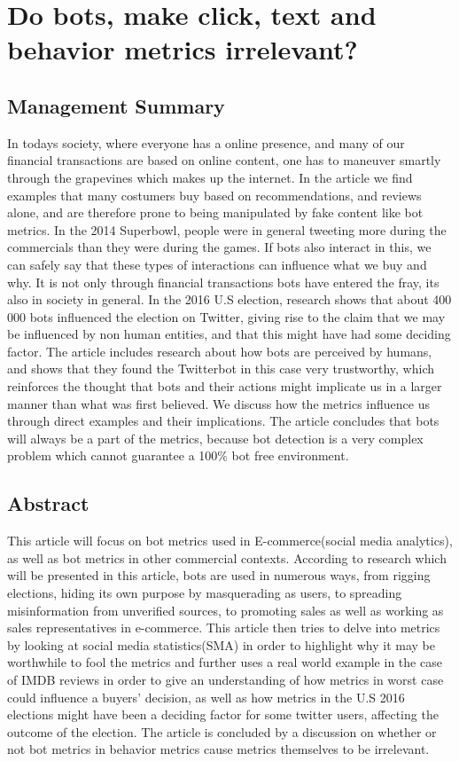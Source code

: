 \chapter[Bot Metrics]{Do bots,  make click, text and behavior metrics irrelevant?}
\section{Management Summary}
In todays society, where everyone has a online presence, and many of our financial transactions are based on online content, one has to maneuver smartly through the grapevines which makes up the internet. In the article we find examples that many costumers buy based on recommendations, and reviews alone, and are therefore prone to being manipulated by fake content like bot metrics. In the 2014 Superbowl, people were in general tweeting more during the commercials than they were during the games. If bots also interact in this, we can safely say that these types of interactions can influence what we buy and why. 
It is not only through financial transactions bots have entered the fray, its also in society in general. In the 2016 U.S election, research shows that about 400 000 bots influenced the election on Twitter, giving rise to the claim that we may be influenced by non human entities, and that this might have had some deciding factor. The article includes research about how bots are perceived by humans, and shows that they found the Twitterbot in this case very trustworthy, which reinforces the thought that bots and their actions might implicate us in a larger manner than what was first believed. We discuss how the metrics influence us through direct examples and their implications. The article concludes that bots will always be a part of the metrics, because bot detection is a very complex problem which cannot guarantee a 100\% bot free environment. 

\section{Abstract}
This article will focus on bot metrics used in E-commerce(social media analytics), as well as bot metrics in other commercial contexts. According to research which will be presented in this article, bots are used in numerous ways, from rigging elections, hiding its own purpose by masquerading as users, to spreading misinformation from unverified sources, to promoting sales as well as working as sales representatives in e-commerce. This article then tries to delve into metrics by looking at social media statistics(SMA) in order to highlight why it may be worthwhile to fool the metrics and further uses a real world example in the case of IMDB reviews in order to give an understanding of how metrics in worst case could influence a buyers' decision, as well as how metrics in the U.S 2016 elections might have been a deciding factor for some twitter users, affecting the outcome of the election. The article is concluded by a discussion on whether or not bot metrics in behavior metrics cause metrics themselves to be irrelevant. 

